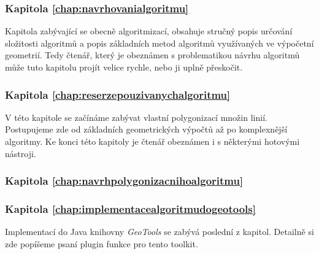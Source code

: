 \subsubsection{Kapitola \ref{chap:navrhovanialgoritmu}}
	Kapitola zabývající se obecně algoritmizací, obsahuje stručný popis určování složitosti algoritmů a popis základních metod algoritmů využívaných ve výpočetní geometrií. Tedy čtenář, který je obeznámen s problematikou návrhu algoritmů může tuto kapitolu projít velice rychle, nebo ji uplně přeskočit.

\subsubsection{Kapitola \ref{chap:reserzepouzivanychalgoritmu}}
 	V této kapitole se začínáme zabývat vlastní polygonizací množin linií. Postupujeme zde od základních geometrických výpočtů až po komplexnější algoritmy. Ke konci této kapitoly je čtenář obeznámen i s některými hotovými nástroji.

\subsubsection{Kapitola \ref{chap:navrhpolygonizacnihoalgoritmu}}
	
	

\subsubsection{Kapitola \ref{chap:implementacealgoritmudogeotools}}
	Implementací do Java knihovny \textit{GeoTools} se zabývá poslední z kapitol. Detailně si zde popíšeme psaní plugin funkce pro tento toolkit.


